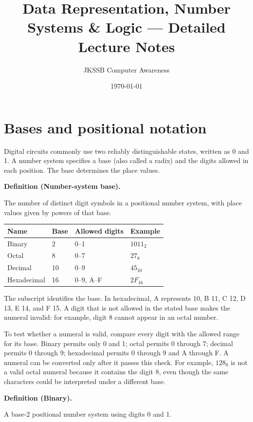 \documentclass[11pt]{article}
\title{Data Representation, Number Systems \& Logic --- Detailed Lecture Notes}
\author{JKSSB Computer Awareness}
\date{\today}
\newenvironment{definitionbox}[1]{%
  \par\noindent\textbf{Definition (#1).}\ \itshape
}{\par\vspace{0.3em}}
\begin{document}
\maketitle

\section{Bases and positional notation}
Digital circuits commonly use two reliably distinguishable states, written
as 0 and 1. A number system specifies a base (also called a radix) and the
digits allowed in each position. The base determines the place values.

\begin{definitionbox}{Number-system base}
The number of distinct digit symbols in a positional number system, with
place values given by powers of that base.
\end{definitionbox}

\begin{center}
\begin{tabular}{llll}
\textbf{Name} & \textbf{Base} & \textbf{Allowed digits} &
\textbf{Example}\\
\hline
Binary & 2 & 0--1 & $1011_2$\\
Octal & 8 & 0--7 & $27_8$\\
Decimal & 10 & 0--9 & $45_{10}$\\
Hexadecimal & 16 & 0--9, A--F & $2F_{16}$\\
\end{tabular}
\end{center}

The subscript identifies the base. In hexadecimal, A represents 10, B 11,
C 12, D 13, E 14, and F 15. A digit that is not allowed in the stated base
makes the numeral invalid: for example, digit 8 cannot appear in an octal
number.

To test whether a numeral is valid, compare every digit with the allowed
range for its base. Binary permits only 0 and 1; octal permits 0 through 7;
decimal permits 0 through 9; hexadecimal permits 0 through 9 and A through
F. A numeral can be converted only after it passes this check. For example,
$128_8$ is not a valid octal numeral because it contains the digit 8, even
though the same characters could be interpreted under a different base.

\begin{definitionbox}{Binary}
A base-2 positional number system using digits 0 and 1.
\end{definitionbox}
\end{document}
